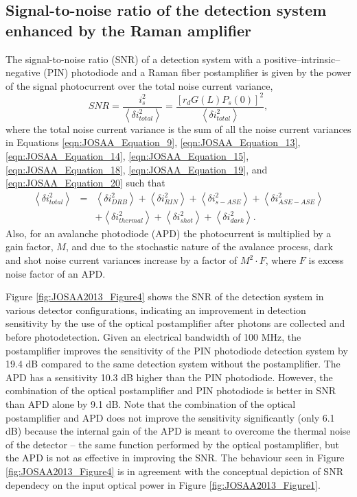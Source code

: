 \subsection{Signal-to-noise ratio of the detection system enhanced by the Raman amplifier}

The signal-to-noise ratio (SNR) of a detection system with a positive–intrinsic–negative (PIN) photodiode and a Raman fiber postamplifier is given by the power of the signal photocurrent over the total noise current variance,
\begin{equation}
{SNR} = \frac{i_s^2}{\left\langle \delta i_{total}^2\right\rangle}=\frac{[r_d G(L) P_s(0)]^2}{\left\langle \delta i_{total}^2\right\rangle},\label{eqn:JOSAA_Equation_22}
\end{equation}
where the total noise current variance is the sum of all the noise current variances in Equations \eqref{eqn:JOSAA_Equation_9}, \eqref{eqn:JOSAA_Equation_13}, \eqref{eqn:JOSAA_Equation_14}, \eqref{eqn:JOSAA_Equation_15}, \eqref{eqn:JOSAA_Equation_18}, \eqref{eqn:JOSAA_Equation_19}, and \eqref{eqn:JOSAA_Equation_20} such that
\begin{eqnarray}
\left\langle \delta i_{total}^2\right\rangle &=&\left\langle \delta i_{DRB}^2\right\rangle+\left\langle \delta i_{RIN}^2\right\rangle+\left\langle \delta i_{s-ASE}^2\right\rangle+\left\langle \delta i_{ASE-ASE}^2\right\rangle \nonumber\\
&&+\left\langle \delta i_{thermal}^2\right\rangle+\left\langle \delta i_{shot}^2\right\rangle+\left\langle \delta i_{dark}^2\right\rangle.\label{eqn:JOSAA_Equation_23}
\end{eqnarray}
Also, for an avalanche photodiode (APD) the photocurrent is multiplied by a gain factor, $M$, and due to the stochastic nature of the avalance process, dark and shot noise current variances increase by a factor of $M^2 \cdot F$, where $F$ is excess noise factor of an APD.

Figure \ref{fig:JOSAA2013_Figure4} shows the SNR of the detection system in various detector configurations, indicating an improvement in detection sensitivity by the use of the optical postamplifier after photons are collected and before photodetection. Given an electrical bandwidth of 100 MHz, the postamplifier improves the sensitivity of the PIN photodiode detection system by 19.4 dB compared to the same detection system without the postamplifier. The APD has a sensitivity 10.3 dB higher than the PIN photodiode. However, the combination of the optical postamplifier and PIN photodiode is better in SNR than APD alone by 9.1 dB. Note that the combination of the optical postamplifier and APD does not improve the sensitivity significantly (only 6.1 dB) because the internal gain of the APD is meant to overcome the thermal noise of the detector – the same function performed by the optical postamplifier, but the APD is not as effective in improving the SNR. The behaviour seen in Figure \ref{fig:JOSAA2013_Figure4} is in agreement with the conceptual depiction of SNR dependecy on the input optical power in Figure \ref{fig:JOSAA2013_Figure1}.

